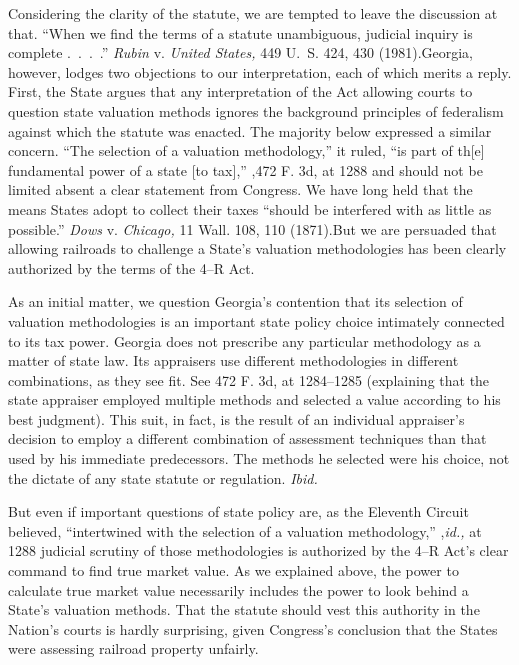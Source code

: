   Considering the clarity of the statute, we are tempted to leave the discussion at that. ``When we find the terms of a statute unambiguous, judicial inquiry is complete .~.~.~.'' \emph{Rubin} v. \emph{United States,} 449 U.~S. 424, 430 (1981).Georgia, however, lodges two objections to our interpretation, each of which merits a reply. First, the State argues that any interpretation of the Act allowing courts to question state valuation methods ignores the background principles of federalism against which the statute was enacted. The majority below expressed a similar concern. ``The selection of a valuation methodology,'' it ruled, ``is part of th[e] fundamental power of a state [to tax],'' ,472 F. 3d, at 1288 and should not be limited absent a clear statement from Congress. We have long held that the means States adopt to collect their taxes ``should be interfered with as little as possible.'' \emph{Dows} v. \emph{Chicago,} 11 Wall. 108, 110 (1871).But we are persuaded that allowing railroads to challenge a State's valuation methodologies has been clearly authorized by the terms of the 4--R Act.

  As an initial matter, we question Georgia's contention that its selection of valuation methodologies is an important state policy choice intimately connected to its tax power. Georgia does not prescribe any particular methodology as a matter of state law. Its appraisers use different methodologies in different combinations, as they see fit. See 472 F. 3d, at 1284--1285 (explaining that the state appraiser employed multiple methods and selected a value according to his best judgment). This suit, in fact, is the result of an individual appraiser's decision to employ a different combination of assessment techniques than that used by his immediate predecessors. The methods he selected were his choice, not the dictate of any state statute or regulation. \emph{Ibid.}

  But even if important questions of state policy are, as the Eleventh Circuit believed, ``intertwined with the selection of a valuation methodology,'' ,\emph{id.,} at 1288 judicial scrutiny of \newpage  those methodologies is authorized by the 4--R Act's clear command to find true market value. As we explained above, the power to calculate true market value necessarily includes the power to look behind a State's valuation methods. That the statute should vest this authority in the Nation's courts is hardly surprising, given Congress's conclusion that the States were assessing railroad property unfairly.

